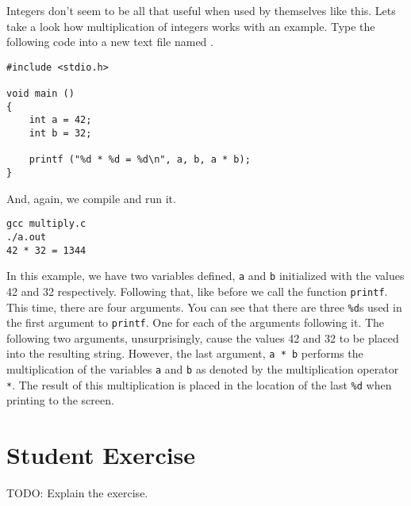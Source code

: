 Integers don't seem to be all that useful when used by themselves like this.
Lets take a look how multiplication of integers works with an example. Type
the following code into a new text file named .

\begin{Verbatim}
#include <stdio.h>

void main ()
{
    int a = 42;
    int b = 32;

    printf ("%d * %d = %d\n", a, b, a * b);
}
\end{Verbatim}

And, again, we compile and run it.

\begin{Verbatim}
gcc multiply.c
./a.out
42 * 32 = 1344
\end{Verbatim}

In this example, we have two variables defined, \verb|a| and \verb|b|
initialized with the values 42 and 32 respectively. Following that, like before
we call the function \verb|printf|. This time, there are four arguments. You can
see that there are three \verb|%d|s used in the first argument to \verb|printf|.
One for each of the arguments following it. The following two arguments,
unsurprisingly, cause the values 42 and 32 to be placed into the resulting
string. However, the last argument, \verb|a * b| performs the multiplication of
the variables \verb|a| and \verb|b| as denoted by the multiplication operator
\verb|*|. The result of this multiplication is placed in the location of the
last \verb|%d| when printing to the screen.

\section{Student Exercise}

TODO: Explain the exercise.
